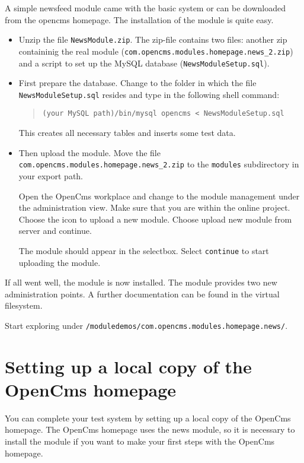 A simple newsfeed module came with the basic system or can be downloaded
from the opencms homepage. The installation of the module is quite easy.

\begin{itemize}
\item Unzip the file \texttt{NewsModule.zip}.
The zip-file contains two files: another zip containinig the real module 
(\texttt{com.opencms.modules.homepage.news\_2.zip})
and a script to set up the MySQL database (\texttt{NewsModuleSetup.sql}).

\item
First prepare the database.
Change to the folder in which the file \\
\texttt{NewsModuleSetup.sql} resides and type in the following shell command:

\begin{quote}
\texttt{(your MySQL path)/bin/mysql opencms < NewsModuleSetup.sql}
\end{quote}

This creates all necessary tables and inserts some test data.

\item Then upload the module.
Move the file \\
\texttt{com.opencms.modules.homepage.news\_2.zip} to the \texttt{modules}
subdirectory in your export path.

Open the OpenCms workplace and change to the module management under the
administration view.
Make sure that you are within the online project.
Choose the icon to upload a new module.
Choose upload new module from server and continue.

The module should appear in the selectbox. 
Select \texttt{continue} to start uploading the module.
\end{itemize}

If all went well, the module is now installed.
The module provides two new administration points. A further documentation
can be found in the virtual filesystem. 

Start exploring under \texttt{/moduledemos/com.opencms.modules.homepage.news/}. 


\section{Setting up a local copy of the OpenCms homepage}
You can complete your test system by setting up a local copy of the OpenCms homepage.
The OpenCms homepage uses the news module, so it is necessary to install the module if
you want to make your first steps with the OpenCms homepage.

